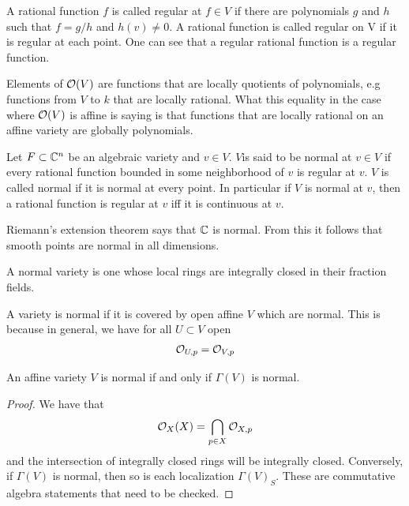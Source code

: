 \documentclass[12pt]{article}
\begin{document}
A rational function $f$ is called regular at $f\in V$ if there are polynomials $g$ and $h$ such that $f = g/h$ and $h(v) \neq 0$. A rational function is called regular on V if it is regular at each point. One can see that a regular rational function is a regular function.

Elements of $\mathcal{O}(V)$ are functions that are locally quotients of polynomials, e.g functions from $V$ to $k$ that are locally rational. What this equality in the case where $\mathcal{O}(V)$ is affine is saying is that functions that are locally rational on an affine variety are globally polynomials.

Let $F\subset\mathbb{C}^n$ be an algebraic variety and $v\in V$. $V$is said to be normal at $v\in V$ if every rational function bounded in some neighborhood of $v$ is regular at $v$. $V$ is called normal if it is normal at every point. In particular if $V$ is normal at $v$, then a rational function is regular at $v$ iff it is continuous at $v$. 

Riemann's extension theorem says that $\mathbb{C}$ is normal. From this it follows that smooth points are normal in all dimensions.

\begin{definition}
    A normal variety is one whose local rings are integrally closed in their fraction fields.
\end{definition}
\begin{fact}
    A variety is normal if it is covered by open affine $V$ which are normal. This is because in general, we have for all $U\subset V$ open \begin{align*}
        \mathcal{O}_{U,p} = \mathcal{O}_{V,p}
    \end{align*}
\end{fact}
\begin{fact}
    An affine variety $V$ is normal if and only if $\Gamma(V)$ is normal.
\end{fact}
\begin{proof}
    We have that \begin{align*}
        \mathcal{O}_X(X) = \bigcap_{p\in X}\mathcal{O}_{X,p}
    \end{align*} and the intersection of integrally closed rings will be integrally closed. Conversely, if $\Gamma(V)$ is normal, then so is each localization $\Gamma(V)_S$. These are commutative algebra statements that need to be checked.
\end{proof}
\end{document}

